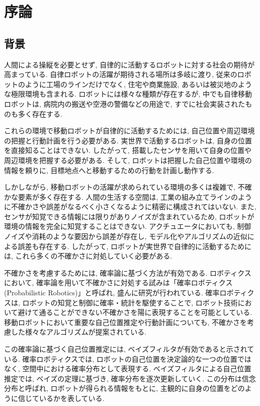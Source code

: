 \chapter{序論} \label{chapter:introduction}


\section{背景} \label{section:backglound}

人間による操縦を必要とせず, 自律的に活動するロボットに対する社会の期待が高まっている. 
自律ロボットの活躍が期待される場所は多岐に渡り, 従来のロボットのように工場のラインだけでなく, 住宅や商業施設, あるいは被災地のような極限環境も含まれる. 
ロボットには様々な種類が存在するが, 中でも自律移動ロボットは, 病院内の搬送や空港の警備などの用途で, すでに社会実装されたものも多く存在する. 

これらの環境で移動ロボットが自律的に活動するためには, 自己位置や周辺環境の把握と行動計画を行う必要がある. 
実世界で活動するロボットは, 自身の位置を直接知ることはできない.  %
したがって, 搭載したセンサを用いて自身の位置や周辺環境を把握する必要がある. 
そして, ロボットは把握した自己位置や環境の情報を頼りに, 目標地点へと移動するための行動を計画し動作する. 

しかしながら, 移動ロボットの活躍が求められている環境の多くは複雑で, 不確かな要素が多く存在する. 
人間の生活する空間は, 工業の組み立てラインのように不確かさや誤差がなるべく小さくなるように精密に構成されてはいない. 
また, センサが知覚できる情報には限りがありノイズが含まれているため, ロボットが環境の情報を完全に知覚することはできない. 
アクチュエータにおいても, 制御ノイズや消耗のような要因から誤差が存在し, モデル化やアルゴリズムの近似による誤差も存在する. 
したがって, ロボットが実世界で自律的に活動するためには, これら多くの不確かさに対処していく必要がある. 

不確かさを考慮するためには, 確率論に基づく方法が有効である. 
ロボティクスにおいて, 確率論を用いて不確かさに対処する試みは「確率ロボティクス(Probabilistic Robotics)」と呼ばれ, 盛んに研究が行われている\cite{thrun2005,上田2007prob}. 
確率ロボティクスは, ロボットの知覚と制御に確率・統計を駆使することで, ロボット技術において避けて通ることができない不確かさを陽に表現することを可能としている. 
移動ロボットにおいて重要な自己位置推定や行動計画についても, 不確かさを考慮した様々なアルゴリズムが提案されている. 

この確率論に基づく自己位置推定には, ベイズフィルタが有効であると示されている. 
確率ロボティクスでは, ロボットの自己位置を決定論的な一つの位置ではなく, 空間中における確率分布として表現する. 
ベイズフィルタによる自己位置推定では, ベイズの定理に基づき, 確率分布を逐次更新していく. 
この分布は信念分布と呼ばれ, ロボットが得られる情報をもとに, 主観的に自身の位置をどのように信じているかを表している. 

